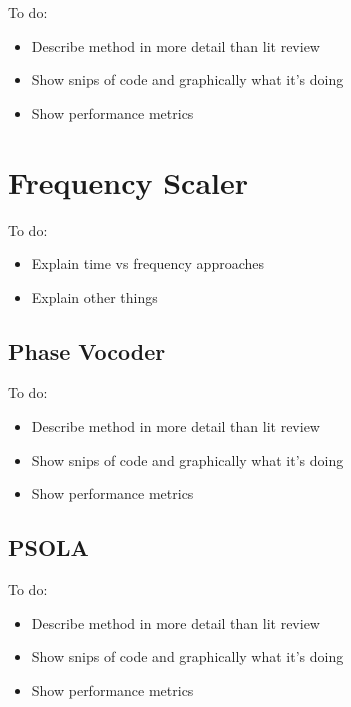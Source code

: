 \color{red}
To do:
\begin{itemize}
	\item Describe method in more detail than lit review
	\item Show snips of code and graphically what it's doing
	\item Show performance metrics
\end{itemize}
\color{black}

\section{Frequency Scaler}

\color{red}
To do:
\begin{itemize}
	\item Explain time vs frequency approaches
	\item Explain other things
\end{itemize}
\color{black}

\subsection{Phase Vocoder}

\color{red}
To do:
\begin{itemize}
	\item Describe method in more detail than lit review
	\item Show snips of code and graphically what it's doing
	\item Show performance metrics
\end{itemize}
\color{black}

\subsection{PSOLA}

\color{red}
To do:
\begin{itemize}
	\item Describe method in more detail than lit review
	\item Show snips of code and graphically what it's doing
	\item Show performance metrics
\end{itemize}
\color{black}

